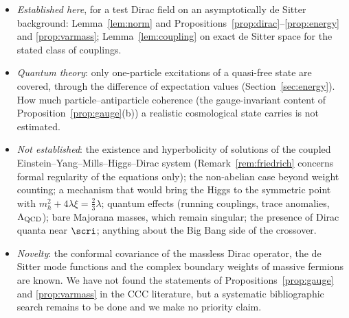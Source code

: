\begin{itemize}[leftmargin=1.5em]
\item \emph{Established here}, for a test Dirac field on an asymptotically de Sitter background: Lemma~\ref{lem:norm} and Propositions~\ref{prop:dirac}--\ref{prop:energy} and \ref{prop:varmass}; Lemma~\ref{lem:coupling} on exact de Sitter space for the stated class of couplings.
\item \emph{Quantum theory}: only one-particle excitations of a quasi-free state are covered, through the difference of expectation values (Section~\ref{sec:energy}). How much particle--antiparticle coherence (the gauge-invariant content of Proposition~\ref{prop:gauge}(b)) a realistic cosmological state carries is not estimated.
\item \emph{Not established}: the existence and hyperbolicity of solutions of the coupled Einstein--Yang--Mills--Higgs--Dirac system (Remark~\ref{rem:friedrich} concerns formal regularity of the equations only); the non-abelian case beyond weight counting; a mechanism that would bring the Higgs to the symmetric point with $m_{h}^{2}+4\lambda\xi=\tfrac23\lambda$; quantum effects (running couplings, trace anomalies, $\Lambda_{\rm QCD}$); bare Majorana masses, which remain singular; the presence of Dirac quanta near $\scri$; anything about the Big Bang side of the crossover.
\item \emph{Novelty}: the conformal covariance of the massless Dirac operator, the de Sitter mode functions and the complex boundary weights of massive fermions are known. We have not found the statements of Propositions~\ref{prop:gauge} and \ref{prop:varmass} in the CCC literature, but a systematic bibliographic search remains to be done and we make no priority claim.
\end{itemize}

